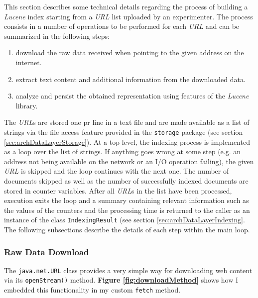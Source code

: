 \documentclass[a4paper]{usiinfbachelorproject}
\begin{document}
This section describes some technical details regarding the process of building a \emph{Lucene} index starting from
a \emph{URL} list uploaded by an experimenter. The process consists in a number of operations to be performed
for each \emph{URL} and can be summarized in the following steps:

    \begin{enumerate}

        \item download the raw data received when pointing to the given address on the internet. 

        \item extract text content and additional information from the downloaded data.

        \item analyze and persist the obtained representation using features of the \emph{Lucene} library.

    \end{enumerate}

The \emph{URL}s are stored one pr line in a text file and are made available as a list of strings via
the file access feature provided in the \texttt{storage} package (see section \ref{sec:archDataLayerStorage}).
At a top level, the indexing process is implemented as a loop over the list of strings. If anything goes wrong
at some step (e.g. an address not being available on the network or an I/O operation failing), the given
\emph{URL} is skipped and the loop continues with the next one. The number of documents skipped as well as the
number of successfully indexed documents are stored in counter variables. After all \emph{URL}s in the list have
been processed, execution exits the loop and a summary containing relevant information such as the values
of the counters and the processing time is returned to the caller as an instance of the class 
\texttt{IndexingResult} (see section \ref{sec:archDataLayerIndexing}.
The following subsections describe the details of each step within the main loop.

\subsubsection{Raw Data Download}

The \texttt{java.net.URL} class provides a very simple way for downloading web content via its 
\texttt{openStream()} method. \textbf{Figure \ref{fig:downloadMethod}} shows how I embedded
this functionality in my custom \texttt{fetch} method.
\end{document}
